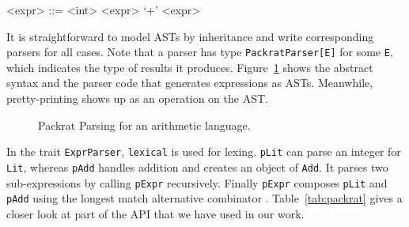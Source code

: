 \setlength{\grammarindent}{5em}
\begin{grammar}
<expr> ::= <int>
    \alt <expr> `+' <expr>
\end{grammar}

It is straightforward to model ASTs by inheritance and write corresponding parsers for all cases.
Note that a parser has type \lstinline{PackratParser[E]} for some
\lstinline{E}, which indicates the type of results it produces. Figure~\ref{fig:packrat-arith} shows the abstract syntax and
the parser code that generates expressions as ASTs. Meanwhile, pretty-printing shows up as an operation on the AST.

\begin{figure}[t]
\centering
\caption{Packrat Parsing for an arithmetic language.}\label{fig:packrat-arith}
\end{figure}


In the trait \lstinline{ExprParser}, \lstinline{lexical} is used for lexing. \lstinline{pLit} can parse an integer for \lstinline{Lit},
whereas \lstinline{pAdd} handles addition and creates an object of \lstinline{Add}. It parses two sub-expressions by calling \lstinline{pExpr}
recursively. Finally \lstinline{pExpr} composes \lstinline{pLit} and \lstinline{pAdd} using the longest match alternative combinator \inlinecode{|||}.
Table~\ref{tab:packrat} gives a closer look at part of the API that we have used in our work.

